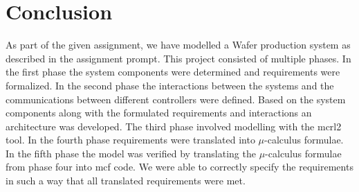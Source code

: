 \documentclass[a4paper,12pt]{article}
\begin{document}
\section{Conclusion}
As part of the given assignment, we have modelled a Wafer production system as described in the assignment prompt. This project consisted of multiple phases. In the first phase the system components were determined and requirements were formalized. In the second phase the interactions between the systems and the communications between different controllers were defined. Based on the system components along with the formulated requirements and interactions an architecture was developed. The third phase involved modelling with the mcrl2 tool. In the fourth phase requirements were translated into $\mu$-calculus formulae. In the fifth phase the model was verified by translating the $\mu$-calculus formulae from phase four into mcf code. We were able to correctly specify the requirements in such a way that all translated requirements were met.

\newpage
\appendix
\end{document}
